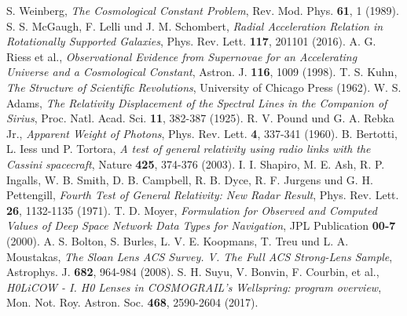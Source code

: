\documentclass[12pt,a4paper]{article}
\begin{document}
\begin{thebibliography}{99}
		 S. Weinberg, \textit{The Cosmological Constant Problem}, Rev. Mod. Phys. \textbf{61}, 1 (1989).
		 S. S. McGaugh, F. Lelli und J. M. Schombert, \textit{Radial Acceleration Relation in Rotationally Supported Galaxies}, Phys. Rev. Lett. \textbf{117}, 201101 (2016).
		 A. G. Riess et al., \textit{Observational Evidence from Supernovae for an Accelerating Universe and a Cosmological Constant}, Astron. J. \textbf{116}, 1009 (1998).
		 T. S. Kuhn, \textit{The Structure of Scientific Revolutions}, University of Chicago Press (1962).
		 W. S. Adams, \textit{The Relativity Displacement of the Spectral Lines in the Companion of Sirius}, Proc. Natl. Acad. Sci. \textbf{11}, 382-387 (1925).
		 R. V. Pound und G. A. Rebka Jr., \textit{Apparent Weight of Photons}, Phys. Rev. Lett. \textbf{4}, 337-341 (1960).
		 B. Bertotti, L. Iess und P. Tortora, \textit{A test of general relativity using radio links with the Cassini spacecraft}, Nature \textbf{425}, 374-376 (2003).
		 I. I. Shapiro, M. E. Ash, R. P. Ingalls, W. B. Smith, D. B. Campbell, R. B. Dyce, R. F. Jurgens und G. H. Pettengill, \textit{Fourth Test of General Relativity: New Radar Result}, Phys. Rev. Lett. \textbf{26}, 1132-1135 (1971).
		 T. D. Moyer, \textit{Formulation for Observed and Computed Values of Deep Space Network Data Types for Navigation}, JPL Publication \textbf{00-7} (2000).
		 A. S. Bolton, S. Burles, L. V. E. Koopmans, T. Treu und L. A. Moustakas, \textit{The Sloan Lens ACS Survey. V. The Full ACS Strong-Lens Sample}, Astrophys. J. \textbf{682}, 964-984 (2008).
		 S. H. Suyu, V. Bonvin, F. Courbin, et al., \textit{H0LiCOW - I. H0 Lenses in COSMOGRAIL's Wellspring: program overview}, Mon. Not. Roy. Astron. Soc. \textbf{468}, 2590-2604 (2017).
	\end{thebibliography}
	
\end{document}

